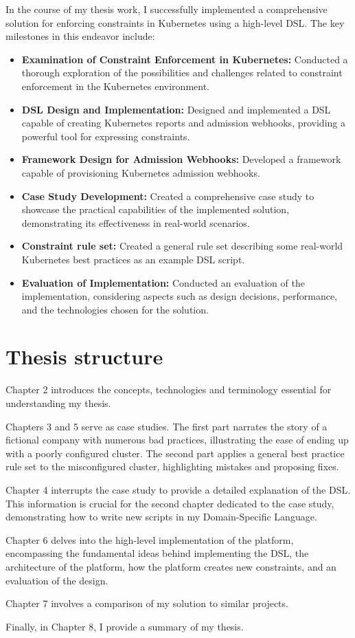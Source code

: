 In the course of my thesis work, I successfully implemented a comprehensive solution for enforcing constraints in Kubernetes using a high-level DSL. The key milestones in this endeavor include:

\begin{itemize}
    \item \textbf{Examination of Constraint Enforcement in Kubernetes:} Conducted a thorough exploration of the possibilities and challenges related to constraint enforcement in the Kubernetes environment.
    \item \textbf{DSL Design and Implementation:} Designed and implemented a DSL capable of creating Kubernetes reports and admission webhooks, providing a powerful tool for expressing constraints.
    \item \textbf{Framework Design for Admission Webhooks:} Developed a framework capable of provisioning Kubernetes admission webhooks.
    \item \textbf{Case Study Development:} Created a comprehensive case study to showcase the practical capabilities of the implemented solution, demonstrating its effectiveness in real-world scenarios.
    \item \textbf{Constraint rule set:} Created a general rule set describing some real-world Kubernetes best practices as an example DSL script.
    \item \textbf{Evaluation of Implementation:} Conducted an evaluation of the implementation, considering aspects such as design decisions, performance, and the technologies chosen for the solution.
\end{itemize}

\clearpage
\section{Thesis structure}

Chapter 2 introduces the concepts, technologies and terminology essential for understanding my thesis.

Chapters 3 and 5 serve as case studies. The first part narrates the story of a fictional company with numerous bad practices, illustrating the ease of ending up with a poorly configured cluster. The second part applies a general best practice rule set to the misconfigured cluster, highlighting mistakes and proposing fixes.

Chapter 4 interrupts the case study to provide a detailed explanation of the DSL. This information is crucial for the second chapter dedicated to the case study, demonstrating how to write new scripts in my Domain-Specific Language.

Chapter 6 delves into the high-level implementation of the platform, encompassing the fundamental ideas behind implementing the DSL, the architecture of the platform, how the platform creates new constraints, and an evaluation of the design.

Chapter 7 involves a comparison of my solution to similar projects.

Finally, in Chapter 8, I provide a summary of my thesis.
